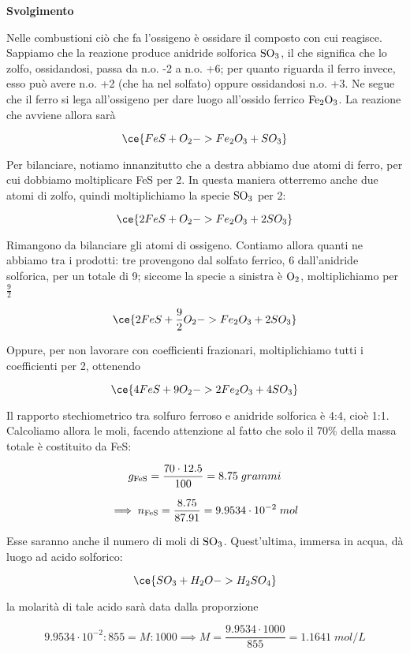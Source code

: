 \vspace{0.2cm}\large\textbf{Svolgimento}\normalsize

\vspace{0.2cm}Nelle combustioni ciò che fa l'ossigeno è ossidare il composto con cui reagisce. Sappiamo che la reazione produce anidride solforica $\rm SO_3$, il che significa che lo zolfo, ossidandosi, passa da n.o. -2 a n.o. +6; per quanto riguarda il ferro invece, esso può avere n.o. +2 (che ha nel solfato) oppure ossidandosi n.o. +3. Ne segue che il ferro si lega all'ossigeno per dare luogo all'ossido ferrico $\rm Fe_2O_3$. La reazione che avviene allora sarà

$$\ce{FeS + O_2 -> Fe_2O_3 + SO_3}$$

Per bilanciare, notiamo innanzitutto che a destra abbiamo due atomi di ferro, per cui dobbiamo moltiplicare FeS per 2. In questa maniera otterremo anche due atomi di zolfo, quindi moltiplichiamo la specie $\rm SO_3$ per 2:

$$\ce{2FeS + O_2 -> Fe_2O_3 + 2SO_3}$$

Rimangono da bilanciare gli atomi di ossigeno. Contiamo allora quanti ne abbiamo tra i prodotti: tre provengono dal solfato ferrico, 6 dall'anidride solforica, per un totale di 9; siccome la specie a sinistra è $\rm O_2$, moltiplichiamo per $\frac{9}{2}$

$$\ce{2FeS + \frac{9}{2}O_2 -> Fe_2O_3 + 2SO_3}$$

Oppure, per non lavorare con coefficienti frazionari, moltiplichiamo tutti i coefficienti per 2, ottenendo

$$\ce{4FeS + 9O_2 -> 2Fe_2O_3 + 4SO_3}$$

Il rapporto stechiometrico tra solfuro ferroso e anidride solforica è 4:4, cioè 1:1. Calcoliamo allora le moli, facendo attenzione al fatto che solo il 70\% della massa totale è costituito da FeS:

$$g_{\rm FeS}=\frac{70 \cdot 12.5}{100}=8.75\;grammi$$

$$\implies
n_{\rm FeS}=\frac{8.75}{87.91}=9.9534 \cdot 10^{-2}\;mol$$

Esse saranno anche il numero di moli di $\rm SO_3$. Quest'ultima, immersa in acqua, dà luogo ad acido solforico:

$$\ce{SO_3 + H_2O -> H_2SO_4}$$

la molarità di tale acido sarà data dalla proporzione

$$9.9534 \cdot 10^{-2}:855=M:1000
\implies
M=\frac{9.9534 \cdot 1000}{855}=1.1641\;mol/L$$

